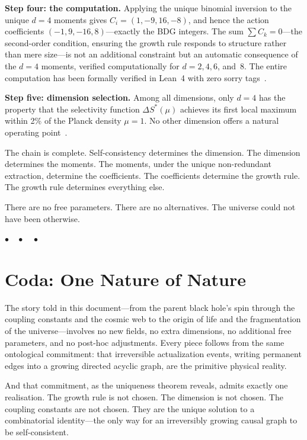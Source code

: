 \documentclass[12pt,a4paper]{article}
\begin{document}
\textbf{Step four: the computation.} Applying the unique binomial inversion to the unique $d=4$ moments gives $C_i = (1, -9, 16, -8)$, and hence the action coefficients $(-1, 9, -16, 8)$---exactly the BDG integers. The sum $\sum C_k = 0$---the second-order condition, ensuring the growth rule responds to structure rather than mere size---is not an additional constraint but an automatic consequence of the $d=4$ moments, verified computationally for $d = 2, 4, 6$, and~8. The entire computation has been formally verified in Lean~4 with zero sorry tags~\cite{O14Lean}.

\textbf{Step five: dimension selection.} Among all dimensions, only $d=4$ has the property that the selectivity function $\Delta S^*(\mu)$ achieves its first local maximum within 2\% of the Planck density $\mu=1$. No other dimension offers a natural operating point~\cite{P1}.

The chain is complete. Self-consistency determines the dimension. The dimension determines the moments. The moments, under the unique non-redundant extraction, determine the coefficients. The coefficients determine the growth rule. The growth rule determines everything else.

There are no free parameters. There are no alternatives. The universe could not have been otherwise.

\bigskip\begin{center}$\bullet\quad\bullet\quad\bullet$\end{center}\bigskip

\section{Coda: One Nature of Nature}

The story told in this document---from the parent black hole's spin through the coupling constants and the cosmic web to the origin of life and the fragmentation of the universe---involves no new fields, no extra dimensions, no additional free parameters, and no post-hoc adjustments. Every piece follows from the same ontological commitment: that irreversible actualization events, writing permanent edges into a growing directed acyclic graph, are the primitive physical reality.

And that commitment, as the uniqueness theorem reveals, admits exactly one realisation. The growth rule is not chosen. The dimension is not chosen. The coupling constants are not chosen. They are the unique solution to a combinatorial identity---the only way for an irreversibly growing causal graph to be self-consistent.
\end{document}
